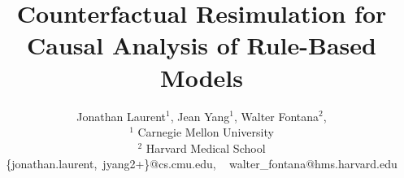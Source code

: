 \documentclass{article}
\title{
  \setstretch{1.15}
  Counterfactual Resimulation for Causal Analysis of
  Rule-Based Models
}
\author{
  Jonathan Laurent$^1$,
  Jean Yang$^1$,
  Walter Fontana$^2$, \\
  $^1$ Carnegie Mellon University \\
  $^2$ Harvard Medical School \\
  \{jonathan.laurent,\ jyang2+\}@cs.cmu.edu, \ 
  walter\_fontana@hms.harvard.edu
}
\begin{document}
\maketitle






%




\nocite{*}


\end{document}

